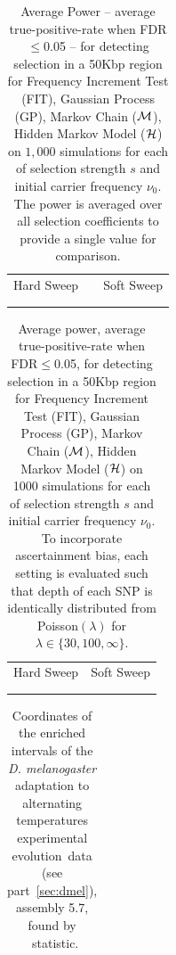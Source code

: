 \documentclass[11pt]{article}
\def\comale{\text{{\sc Comale}}}
\def\data{\emph{D. melanogaster} adaptation to alternating temperatures 
experimental evolution}
\begin{document}
\begin{table}[h]
	\centering
	\begin{tabular}{ccc}
		Hard Sweep & &Soft Sweep\\ \\  
		
		&&
	\end{tabular}
        \caption{Average Power -- average true-positive-rate when FDR$\le$0.05 -- for detecting selection in a 50Kbp region for Frequency Increment Test (FIT), Gaussian Process (GP), Markov Chain (${\cal M}$), Hidden Markov Model (${\cal H}$) on $1,000$ simulations for each of selection strength $s$ and initial carrier frequency $\nu_0$. The power is averaged over all selection coefficients to provide a single value for comparison.}
\label{tab:power}
\end{table}
\clearpage
\newpage
\begin{table}[H]
	\begin{tabular}{c||c}
		Hard Sweep & Soft Sweep\\ \\  
		
				&
	\end{tabular}
	\caption{Average power, average true-positive-rate when FDR$\le$0.05, for 
	detecting selection in a 50Kbp region for Frequency Increment Test (FIT), 
	Gaussian Process (GP), Markov Chain (${\cal M}$), Hidden Markov Model (${\cal H}$) on 
	1000 
		simulations for each of selection strength $s$ and initial 
		carrier frequency $\nu_0$. To incorporate ascertainment bias, each 
		setting is evaluated such that depth of each SNP is identically 
		distributed from Poisson$(\lambda)$ for $\lambda \in 
		\{30,100,\infty\}$.}\label{tab:powerCLR}
\end{table}


\begin{table}[h]
	\centering
	\begin{tabular}{c}
		
	\end{tabular}
	\caption{Coordinates of the enriched intervals of the \data\ data (see 
	part~\ref{sec:dmel}), assembly 
	5.7, found by \comale\ statistic.}\label{tab:intervals}
\end{table}
\end{document}
